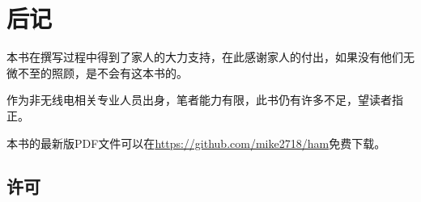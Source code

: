 \chapter*{后记}

本书在撰写过程中得到了家人的大力支持，在此感谢家人的付出，如果没有他们无微不至的照顾，是不会有这本书的。

作为非无线电相关专业人员出身，笔者能力有限，此书仍有许多不足，望读者指正。

本书的最新版PDF文件可以在\url{https://github.com/mike2718/ham}免费下载。

\section*{许可}


